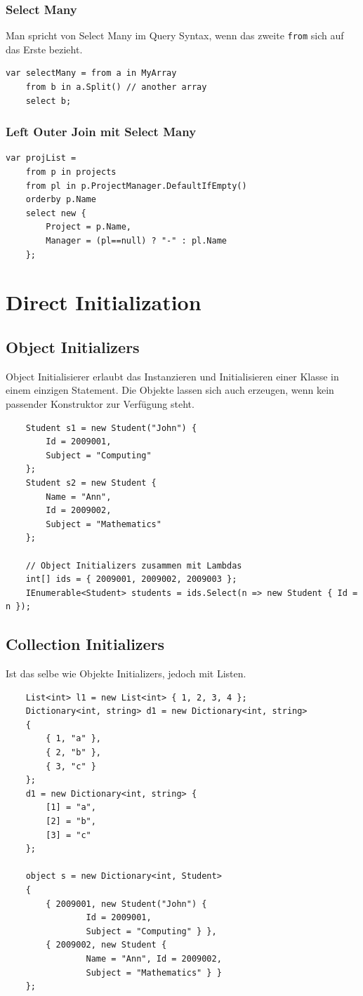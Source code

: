 \documentclass[
a4paper,
oneside,
10pt,
fleqn,
headsepline,
toc=listofnumbered, 
bibliography=totocnumbered]{scrartcl}
\let\stdsection\section
\renewcommand\section{\clearpage\stdsection}
\begin{document}
\subsubsection{Select Many}
Man spricht von Select Many im Query Syntax, wenn das zweite \lstinline|from| sich auf das Erste bezieht.
\begin{lstlisting}
var selectMany = from a in MyArray
	from b in a.Split() // another array
	select b;
\end{lstlisting}

\subsubsection{Left Outer Join mit Select Many}
\begin{lstlisting}
var projList = 
	from p in projects
	from pl in p.ProjectManager.DefaultIfEmpty()
	orderby p.Name
	select new { 
		Project = p.Name,
		Manager = (pl==null) ? "-" : pl.Name 
	};
\end{lstlisting}


\section{Direct Initialization}
\subsection{Object Initializers}
Object Initialisierer erlaubt das Instanzieren und Initialisieren einer Klasse in einem einzigen Statement. Die Objekte lassen sich auch erzeugen, wenn kein passender Konstruktor zur Verfügung steht.
\begin{lstlisting}
	Student s1 = new Student("John") {
		Id = 2009001,
		Subject = "Computing"
	};
	Student s2 = new Student {
		Name = "Ann",
		Id = 2009002,
		Subject = "Mathematics"
	};
	
	// Object Initializers zusammen mit Lambdas
	int[] ids = { 2009001, 2009002, 2009003 };
	IEnumerable<Student> students = ids.Select(n => new Student { Id = n });
\end{lstlisting}

\subsection{Collection Initializers}
Ist das selbe wie Objekte Initializers, jedoch mit Listen.
\begin{lstlisting}
	List<int> l1 = new List<int> { 1, 2, 3, 4 };
	Dictionary<int, string> d1 = new Dictionary<int, string>
	{
		{ 1, "a" },
		{ 2, "b" },
		{ 3, "c" }
	};
	d1 = new Dictionary<int, string> {
		[1] = "a",
		[2] = "b",
		[3] = "c"
	};
	
	object s = new Dictionary<int, Student>
	{
		{ 2009001, new Student("John") {
				Id = 2009001,
				Subject = "Computing" } },
		{ 2009002, new Student {
				Name = "Ann", Id = 2009002,
				Subject = "Mathematics" } }
	};
\end{lstlisting}
\end{document}
